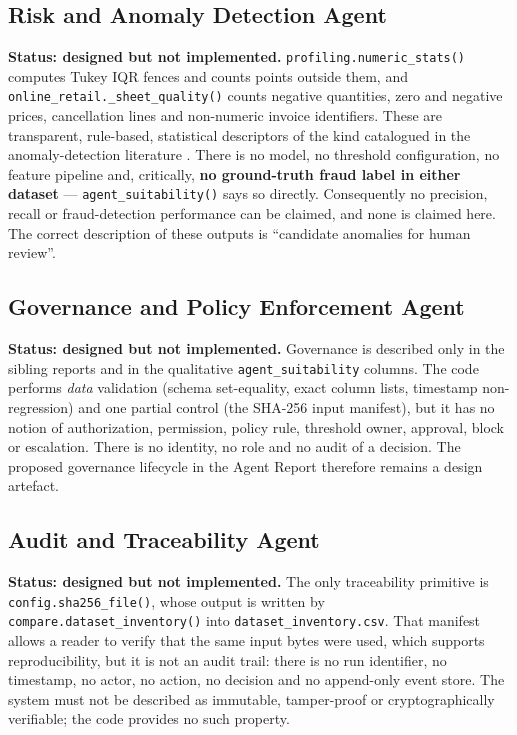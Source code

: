 \documentclass[11pt,a4paper]{article}
\newcommand{\code}[1]{\texttt{#1}}
\begin{document}
\subsection{Risk and Anomaly Detection Agent}
\textbf{Status: designed but not implemented.} \code{profiling.numeric\_stats()} computes Tukey IQR fences and counts points outside them, and \code{online\_retail.\_sheet\_quality()} counts negative quantities, zero and negative prices, cancellation lines and non-numeric invoice identifiers. These are transparent, rule-based, statistical descriptors of the kind catalogued in the anomaly-detection literature \cite{chandola2009,ngai2011}. There is no model, no threshold configuration, no feature pipeline and, critically, \textbf{no ground-truth fraud label in either dataset} --- \code{agent\_suitability()} says so directly. Consequently no precision, recall or fraud-detection performance can be claimed, and none is claimed here. The correct description of these outputs is ``candidate anomalies for human review''.

\subsection{Governance and Policy Enforcement Agent}
\textbf{Status: designed but not implemented.} Governance is described only in the sibling reports and in the qualitative \code{agent\_suitability} columns. The code performs \emph{data} validation (schema set-equality, exact column lists, timestamp non-regression) and one partial control (the SHA-256 input manifest), but it has no notion of authorization, permission, policy rule, threshold owner, approval, block or escalation. There is no identity, no role and no audit of a decision. The proposed governance lifecycle in the Agent Report therefore remains a design artefact.

\subsection{Audit and Traceability Agent}
\textbf{Status: designed but not implemented.} The only traceability primitive is \code{config.sha256\_file()}, whose output is written by \code{compare.dataset\_inventory()} into \code{dataset\_inventory.csv}. That manifest allows a reader to verify that the same input bytes were used, which supports reproducibility, but it is not an audit trail: there is no run identifier, no timestamp, no actor, no action, no decision and no append-only event store. The system must not be described as immutable, tamper-proof or cryptographically verifiable; the code provides no such property.
\end{document}
